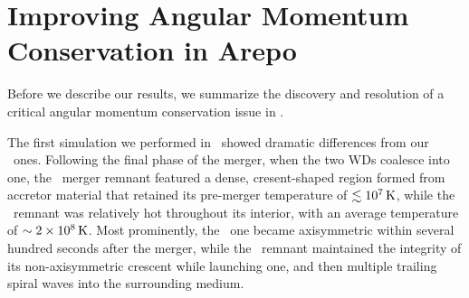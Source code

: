 \section{Improving Angular Momentum Conservation in Arepo}
\label{sec:c3_fixingarepo}

Before we describe our results, we summarize the discovery and resolution of a critical angular momentum conservation issue in \arepo.


The first simulation we performed in \arepo\ showed dramatic differences from our \gasoline\ ones.  Following the final phase of the merger, when the two WDs coalesce into one, the \arepo\ merger remnant featured a dense, cresent-shaped region formed from accretor material that retained its pre-merger temperature of $\lesssim10^7\,\mathrm{K}$, while the \gasoline\ remnant was relatively hot throughout its interior, with an average temperature of $\sim2\times10^8\,\mathrm{K}$.  Most prominently, the \gasoline\ one became axisymmetric within several hundred seconds after the merger, while the \arepo\ remnant maintained the integrity of its non-axisymmetric crescent while launching one, and then multiple trailing spiral waves into the surrounding medium.


